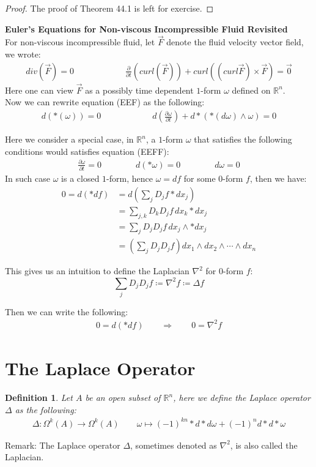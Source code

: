 \documentclass[11pt,oneside]{book}
\theoremstyle{break}
\theoremstyle{break}
\newtheorem{defn}{Definition}[corL]
\newcommand{\R}{\mathbb{R}}
\newcommand{\remark}{\color{blue}Remark: \color{black}}
\begin{document}
\begin{proof}
The proof of Theorem 44.1 is left for exercise.
\end{proof}

\textbf{Euler's Equations for Non-viscous Incompressible Fluid Revisited}\\ For non-viscous incompressible fluid, let $\vec{F}$ denote the fluid velocity vector field, we wrote: 
\begin{align*}
div(\vec{F}) = 0\qquad\qquad\qquad \frac{\partial}{\partial t}(curl(\vec{F})) + curl((curl \vec{F})\times \vec{F}) = \vec{0} \tag{EEF}
\end{align*}
Here one can view $\vec{F}$ as a possibly time dependent $1$-form $\omega$ defined on $\R^n$. \\
Now we can rewrite equation (EEF) as the following: 
\begin{align*}
d(*(\omega)) = 0 \qquad\qquad\qquad d\left( \frac{\partial \omega}{\partial t}\right) + d*(*(d\omega)\wedge \omega) = 0 \tag{EEFF}
\end{align*}


Here we consider a special case, in $\R^n$, a $1$-form $\omega$ that satisfies the following conditions would satisfies equation (EEFF):
\begin{align*}
\frac{\partial \omega}{\partial t} = 0 \qquad \qquad 
d(*\omega) = 0 \qquad \qquad 
d\omega = 0
\end{align*}
In such case $\omega$ is a closed $1$-form, hence $\omega = df$ for some $0$-form $f$, then we have: 
\begin{align*}
0 = d(*df) &=d\left( \sum_j D_j f * dx_j\right) \\
&= \sum_{j,k}D_k D_j f\, dx_k * dx_j \\
&= \sum_j D_j D_j f\, dx_j \wedge * dx_j\\
&= \left(\sum_j D_j D_j f\right) dx_1 \wedge dx_2 \wedge \cdots \wedge dx_n 
\end{align*}

This gives us an intuition to define the Laplacian $\nabla^2$ for $0$-form $f$:
$$\sum_j D_jD_j f \coloneqq \nabla^2 f \coloneqq \Delta f$$

Then we can write the following:
\begin{align*}
0 = d(*df) \qquad \Rightarrow \qquad 0 = \nabla^2 f
\end{align*}
\newpage

\section[The Laplace Operator]{\color{red}The Laplace Operator\color{black}}
\begin{defn}
Let $A$ be an open subset of $\R^n$, here we define the Laplace operator $\Delta$ as the following:
\begin{align*}
\Delta: \Omega^k(A) \to \Omega^k(A) \qquad \omega \mapsto (-1)^{kn}*d*d\omega +(-1)^n d*d*\omega
\end{align*}
\end{defn}
\remark The Laplace operator $\Delta$, sometimes denoted as $\nabla^2$, is also called the Laplacian.\\
\end{document}
